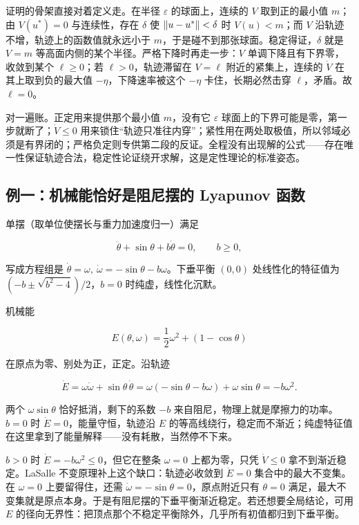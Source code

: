证明的骨架直接对着定义走。在半径 \(\varepsilon\) 的球面上，连续的 \(V\) 取到正的最小值 \(m\)；由 \(V(u^\ast)=0\) 与连续性，存在 \(\delta\) 使 \(\left\lVert u-u^\ast\right\rVert<\delta\) 时 \(V(u)<m\)；而 \(V\) 沿轨迹不增，轨迹上的函数值就永远小于 \(m\)，于是碰不到那张球面。稳定得证，\(\delta\) 就是 \(V=m\) 等高面内侧的某个半径。严格下降时再走一步：\(V\) 单调下降且有下界零，收敛到某个 \(\ell\ge0\)；若 \(\ell>0\)，轨迹滞留在 \(V=\ell\) 附近的紧集上，连续的 \(\dot V\) 在其上取到负的最大值 \(-\eta\)，下降速率被这个 \(-\eta\) 卡住，长期必然击穿 \(\ell\)，矛盾。故 \(\ell=0\)。

对一遍账。正定用来提供那个最小值 \(m\)，没有它 \(\varepsilon\) 球面上的下界可能是零，第一步就断了；\(\dot V\le0\) 用来锁住``轨迹只准往内穿''；紧性用在两处取极值，所以邻域必须是有界闭的；严格负定则专供第二段的反证。全程没有出现解的公式——存在唯一性保证轨迹合法，稳定性论证绕开求解，这是定性理论的标准姿态。

\subsection{例一：机械能恰好是阻尼摆的 Lyapunov 函数}

单摆（取单位使摆长与重力加速度归一）满足

\[
\ddot\theta+\sin\theta+b\dot\theta=0,
\qquad b\ge0,
\]

写成方程组是 \(\dot\theta=\omega,\ \dot\omega=-\sin\theta-b\omega\)。下垂平衡 \((0,0)\) 处线性化的特征值为 \((-b\pm\sqrt{b^2-4})/2\)，\(b=0\) 时纯虚，线性化沉默。

机械能

\[
E(\theta,\omega)=\frac12\omega^2+(1-\cos\theta)
\]

在原点为零、别处为正，正定。沿轨迹

\[
\dot E
=\omega\dot\omega+\sin\theta\,\dot\theta
=\omega(-\sin\theta-b\omega)+\omega\sin\theta
=-b\omega^2.
\]

两个 \(\omega\sin\theta\) 恰好抵消，剩下的系数 \(-b\) 来自阻尼，物理上就是摩擦力的功率。\(b=0\) 时 \(\dot E=0\)，能量守恒，轨迹沿 \(E\) 的等高线绕行，稳定而不渐近；纯虚特征值在这里拿到了能量解释——没有耗散，当然停不下来。

\(b>0\) 时 \(\dot E=-b\omega^2\le0\)，但它在整条 \(\omega=0\) 上都为零，只凭 \(\dot V\le0\) 拿不到渐近稳定。LaSalle 不变原理补上这个缺口：轨迹必收敛到 \(\dot E=0\) 集合中的最大不变集。在 \(\omega=0\) 上要留得住，还需 \(\dot\omega=-\sin\theta=0\)，原点附近只有 \(\theta=0\) 满足，最大不变集就是原点本身。于是有阻尼摆的下垂平衡渐近稳定。若还想要全局结论，可用 \(E\) 的径向无界性：把顶点那个不稳定平衡除外，几乎所有初值都归到下垂平衡。

